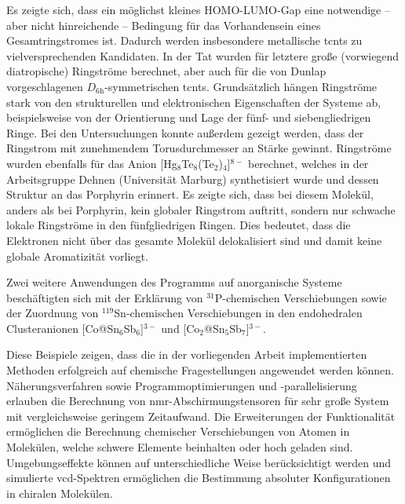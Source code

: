 Es zeigte sich, dass ein möglichst kleines HOMO-LUMO-Gap eine notwendige -- aber nicht hinreichende -- Bedingung für das Vorhandensein eines Gesamtringstromes  ist. Dadurch werden insbesondere metallische \acp{tcnt} zu vielversprechenden Kandidaten. In der Tat wurden für letztere große (vorwiegend diatropische) Ringströme berechnet, aber auch für die von Dunlap vorgeschlagenen $D_{\text{6h}}$-symmetrischen \acp{tcnt}. Grundsätzlich hängen Ringströme stark von den strukturellen und elektronischen Eigenschaften der Systeme ab, beispielsweise von der Orientierung und Lage der fünf- und siebengliedrigen Ringe. Bei den Untersuchungen konnte außerdem gezeigt werden, dass der Ringstrom mit zunehmendem Torusdurchmesser an Stärke gewinnt. 
\vfill
\newpage
Ringströme wurden ebenfalls für das Anion [Hg$_8$Te$_8$(Te$_2$)$_4$]$^{8-}$ berechnet, welches in der Arbeitsgruppe Dehnen (Universität Marburg) synthetisiert wurde und dessen Struktur an das Porphyrin erinnert. Es zeigte sich, dass bei diesem Molekül, anders als bei Porphyrin, kein globaler Ringstrom auftritt, sondern nur schwache lokale Ringströme in den fünfgliedrigen Ringen. Dies bedeutet, dass die Elektronen nicht über das gesamte Molekül delokalisiert sind und damit keine globale Aromatizität vorliegt. 

Zwei weitere Anwendungen des Programms auf anorganische Systeme beschäftigten sich mit der Erklärung von $^{31}$P-chemischen Verschiebungen sowie der Zuordnung von $^{119}$Sn-chemischen Verschiebungen in den endohedralen Clusteranionen [Co@Sn$_6$Sb$_6$]$^{3-}$ und [Co$_2$@Sn$_5$Sb$_7$]$^{3-}$.

\bigskip
Diese Beispiele zeigen, dass die in der vorliegenden Arbeit implementierten Methoden erfolgreich auf chemische Fragestellungen angewendet werden können. Näherungsverfahren sowie Programmoptimierungen und -parallelisierung erlauben die Berechnung von \ac{nmr}-Abschirmungstensoren für sehr große System mit vergleichsweise geringem Zeitaufwand. Die Erweiterungen der Funktionalität ermöglichen die Berechnung chemischer Verschiebungen von Atomen in Molekülen, welche schwere Elemente beinhalten oder hoch geladen sind. Umgebungseffekte können auf unterschiedliche Weise berücksichtigt werden und simulierte \ac{vcd}-Spektren ermöglichen die Bestimmung absoluter Konfigurationen in chiralen Molekülen.
\vfill
\newpage
\thispagestyle{empty}
\cleardoublepage